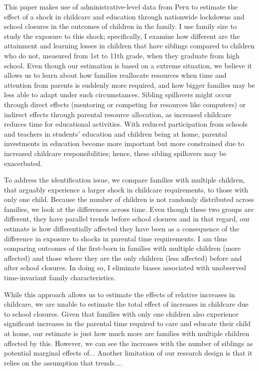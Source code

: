 



This paper makes use of administrative-level data from Peru to estimate the effect of a shock in childcare and education through nationwide lockdowns and school closures in the outcomes of children in the family. I use family size to study the exposure to this shock; specifically, I examine how different are the attainment and learning losses in children that have siblings compared to children who do not, measured from 1st to 11th grade, when they graduate from high school. Even though our estimation is based on a extreme situation, we believe it allows us to learn about how families reallocate resources when time and attention from parents is suddenly more required, and how bigger families may be less able to adapt under such circumstances. Sibling spillovers might occur through direct effects (mentoring or competing for resources like computers) or indirect effects through parental resource allocation, as increased childcare reduces time for educational activities. With reduced participation from schools and teachers in students’ education and children being at home, parental investments in education become more important but more constrained due to increased childcare responsibilities; hence, these sibling spillovers may be exacerbated. 


To address the identification issue, we compare families with multiple children, that arguably experience a larger shock in childcare requirements, to those with only one child. Because the number of children is not randomly distributed across families, we look at the differences across time.  Even though these two groups are different, they have parallel trends before school closures and in that regard, our estimate is how differentially affected they have been as a consequence of the difference in exposure to shocks in parental time requirements. I am thus comparing outcomes of the first-born in families with multiple children (more affected) and those where they are the only children (less affected) before and after school closures. In doing so, I eliminate biases associated with unobserved time-invariant family characteristics.

While this approach allows us to estimate the effects of relative increases in childcare, we are unable to estimate the total effect of increases in childcare due to school closures. Given that families with only one children also experience significant increases in the parental time required to care and educate their child at home, our estimate is just how much more are families with multiple children affected by this. However, we can see the increases with the number of siblings as potential marginal effects of... Another limitation of our research design is that it relies on the assumption that trends....


